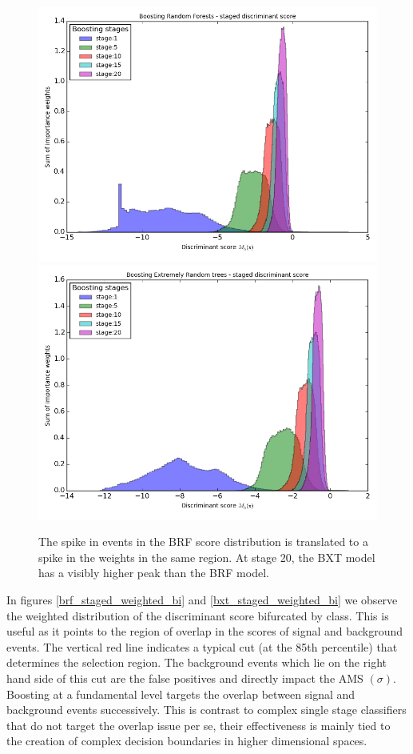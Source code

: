 \begin{figure}
\includegraphics[width=\textwidth]{images/brf_weighted_staged.png}
\includegraphics[width=\textwidth]{images/bxt_weighted_staged.png}
\caption[Evolution of weighted discriminant score in BRF and BXT]{The spike in events in the BRF score distribution is translated to a spike in the weights in the same region. At stage 20, the BXT model has a visibly higher peak than the BRF model.}
\label{staged_weighted}
\end{figure}

In figures \ref{brf_staged_weighted_bi} and \ref{bxt_staged_weighted_bi} we observe the weighted distribution of the discriminant score bifurcated by class. This is useful as it points to the region of overlap in the scores of signal and background events. The vertical red line indicates a typical cut (at the 85th percentile) that determines the selection region. The background events which lie on the right hand side of this cut are the false positives and directly impact the AMS $(\sigma)$. Boosting at a fundamental level targets the overlap between signal and background events successively. This is contrast to complex single stage classifiers that do not target the overlap issue per se, their effectiveness is mainly tied to the creation of complex decision boundaries in higher dimensional spaces. 

